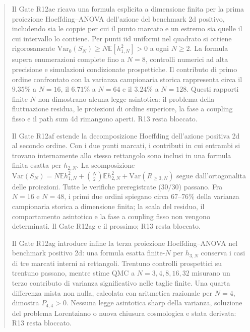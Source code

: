 \documentclass[11pt,a4paper]{article}
\begin{document}
\begin{abstract}
Il Gate R12ae ricava una formula esplicita a dimensione finita per la prima proiezione Hoeffding--ANOVA dell'azione del benchmark 2d positivo, includendo sia le coppie per cui il punto marcato e un estremo sia quelle il cui intervallo lo contiene. Per punti iid uniformi nel quadrato si ottiene rigorosamente $\mathrm{Var}_0(S_N)\ge N\mathbb E[h_{1,N}^2]>0$ a ogni $N\ge2$. La formula supera enumerazioni complete fino a $N=8$, controlli numerici ad alta precisione e simulazioni condizionate prospettiche. Il contributo di primo ordine confrontato con la varianza campionaria storica rappresenta circa il $9.35\%$ a $N=16$, il $6.71\%$ a $N=64$ e il $3.24\%$ a $N=128$. Questi rapporti finite-$N$ non dimostrano alcuna legge asintotica: il problema della fluttuazione residua, le proiezioni di ordine superiore, la fase a coupling fisso e il path sum 4d rimangono aperti. R13 resta bloccato.


Il Gate R12af estende la decomposizione Hoeffding dell'azione positiva 2d al secondo ordine. Con i due punti marcati, i contributi in cui entrambi si trovano internamente allo stesso rettangolo sono inclusi in una formula finita esatta per $h_{2,N}$. La scomposizione $\mathrm{Var}(S_N)=N\mathbb E h_{1,N}^2+\binom N2\mathbb E h_{2,N}^2+\mathrm{Var}(R_{\ge3,N})$ segue dall'ortogonalita delle proiezioni. Tutte le verifiche preregistrate (30/30) passano. Fra $N=16$ e $N=48$, i primi due ordini spiegano circa 67--76\% della varianza campionaria storica a dimensione finita; la scala del residuo, il comportamento asintotico e la fase a coupling fisso non vengono determinati. Il Gate R12ag e il prossimo; R13 resta bloccato.



Il Gate R12ag introduce infine la terza proiezione Hoeffding--ANOVA nel benchmark positivo 2d: una formula esatta finite-$N$ per $h_{3,N}$ conserva i casi di tre marcati interni ai rettangoli. Trentuno controlli prospettici su trentuno passano, mentre stime QMC a $N=3,4,8,16,32$ misurano un terzo contributo di varianza significativo nelle taglie finite. Una quarta differenza mista non nulla, calcolata con aritmetica razionale per $N=4$, dimostra $P_{4,4}>0$. Nessuna legge asintotica sharp della varianza, soluzione del problema Lorentziano o nuova chiusura cosmologica e stata derivata: R13 resta bloccato.



\end{abstract}
\end{document}
